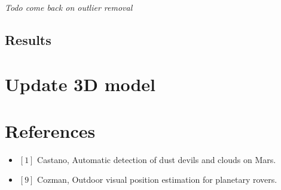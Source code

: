 \documentclass[10pt]{article}
\begin{document}
\textit{Todo come back on outlier removal}
\subsection{Results}

\section{Update 3D model}


\section{References}
\begin{itemize}
\item $[1]$ Castano, Automatic detection of dust devils and clouds on Mars.
\item $[9]$ Cozman, Outdoor visual position estimation for planetary rovers.
\end{itemize}
\end{document}
